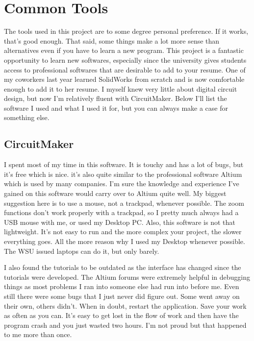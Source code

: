 \documentclass[prb,preprint]{revtex4-1}
\begin{document}
\section{Common Tools}
The tools used in this project are to some degree personal preference. If it works, that's good enough. That said, some things make a lot more sense than alternatives even if you have to learn a new program. This project is a fantastic opportunity to learn new softwares, especially since the university gives students access to professional softwares that are desirable to add to your resume. One of my coworkers last year learned SolidWorks from scratch and is now comfortable enough to add it to her resume. I myself knew very little about digital circuit design, but now I'm relatively fluent with CircuitMaker. Below I'll list the software I used and what I used it for, but you can always make a case for something else.

\subsection{CircuitMaker}
I spent most of my time in this software. It is touchy and has a lot of bugs, but it's free which is nice. it's also quite similar to the professional software Altium which is used by many companies. I'm sure the knowledge and experience I've gained on this software would carry over to Altium quite well. My biggest suggestion here is to use a mouse, not a trackpad, whenever possible. The zoom functions don't work properly with a trackpad, so I pretty much always had a USB mouse with me, or used my Desktop PC. Also, this software is not that lightweight. It's not easy to run and the more complex your project, the slower everything goes. All the more reason why I used my Desktop whenever possible. The WSU issued laptops can do it, but only barely. 

I also found the tutorials to be outdated as the interface has changed since the tutorials were developed. The Altium forums were extremely helpful in debugging things as most problems I ran into someone else had run into before me. Even still there were some bugs that I just never did figure out. Some went away on their own, others didn't. When in doubt, restart the application. Save your work as often as you can. It's easy to get lost in the flow of work and then have the program crash and you just wasted two hours. I'm not proud but that happened to me more than once.
\end{document}
